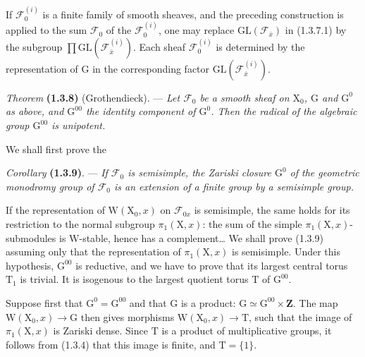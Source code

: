 \documentclass[11pt,leqno]{article}
\begin{document}
If \(\mathscr{F}_0^{(i)}\) is a finite family of smooth sheaves, and the preceding construction is applied to the sum \(\mathscr{F}_0\) of the \(\mathscr{F}_0^{(i)}\), one may replace \(\mathrm{GL}(\mathscr{F}_{\bar{x}})\) in (1.3.7.1) by the subgroup \(\prod\mathrm{GL}(\mathscr{F}_{\bar{x}}^{(i)})\). Each sheaf \(\mathscr{F}_0^{(i)}\) is determined by the representation of \(\mathrm{G}\) in the corresponding factor \(\mathrm{GL}(\mathscr{F}_{\bar{x}}^{(i)})\).

\textit{Theorem} \textbf{(1.3.8)} (Grothendieck). — \textit{Let \(\mathscr{F}_0\) be a smooth sheaf on \(\mathrm{X}_0\), \(\mathrm{G}\) and \(\mathrm{G}^0\) as above, and \(\mathrm{G}^{00}\) the identity component of \(\mathrm{G}^0\). Then the radical of the algebraic group \(\mathrm{G}^{00}\) is unipotent.}

We shall first prove the

\textit{Corollary} \textbf{(1.3.9)}. — \textit{If \(\mathscr{F}_0\) is semisimple, the Zariski closure \(\mathrm{G}^0\) of the geometric monodromy group of \(\mathscr{F}_0\) is an extension of a finite group by a semisimple group.}

If the representation of \(\mathrm{W}(\mathrm{X}_0,x)\) on \(\mathscr{F}_{0x}\) is semisimple, the same holds for its restriction to the normal subgroup \(\pi_1(\mathrm{X},x)\): the sum of the simple \(\pi_1(\mathrm{X},x)\)-submodules is \(\mathrm{W}\)-stable, hence has a complement\ldots{} We shall prove (1.3.9) assuming only that the representation of \(\pi_1(\mathrm{X},x)\) is semisimple. Under this hypothesis, \(\mathrm{G}^{00}\) is reductive, and we have to prove that its largest central torus \(\mathrm{T}_1\) is trivial. It is isogenous to the largest quotient torus \(\mathrm{T}\) of \(\mathrm{G}^{00}\).

Suppose first that \(\mathrm{G}^0=\mathrm{G}^{00}\) and that \(\mathrm{G}\) is a product: \(\mathrm{G}\simeq\mathrm{G}^{00}\times\mathbf{Z}\). The map \(\mathrm{W}(\mathrm{X}_0,x)\to\mathrm{G}\) then gives morphisms \(\mathrm{W}(\mathrm{X}_0,x)\to\mathrm{T}\), such that the image of \(\pi_1(\mathrm{X},x)\) is Zariski dense. Since \(\mathrm{T}\) is a product of multiplicative groups, it follows from (1.3.4) that this image is finite, and \(\mathrm{T}=\{1\}\).
\end{document}
